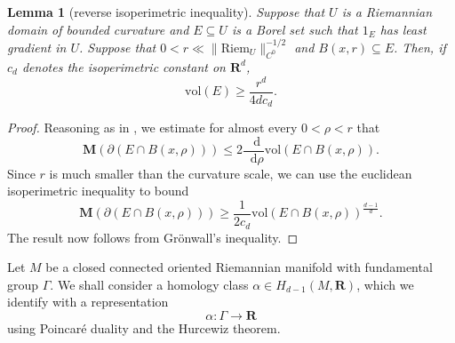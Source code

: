 \documentclass[reqno,11pt]{amsart}
\newcommand{\ZZ}{\mathbf{Z}}
\newcommand{\RR}{\mathbf{R}}
\newcommand{\Sph}{\mathbf S}
\newcommand*\dif{\mathop{}\!\mathrm{d}}
\newcommand{\vol}{\mathrm{vol}}
\DeclareMathOperator{\Gal}{Gal}
\newcommand{\Riem}{\mathrm{Riem}}
\newcommand{\Mass}{\mathbf M}
\newcommand{\dfn}[1]{\emph{#1}\index{#1}}
\newtheorem{lemma}[theorem]{Lemma}
\newtheorem{proposition}[theorem]{Proposition}
\theoremstyle{definition}
\numberwithin{equation}{section}
\begin{document}
\begin{lemma}[reverse isoperimetric inequality]
Suppose that $U$ is a Riemannian domain of bounded curvature and $E \subseteq U$ is a Borel set such that $1_E$ has least gradient in $U$.
Suppose that $0 < r \ll \|\Riem_U\|_{C^0}^{-1/2}$ and $B(x, r) \subseteq E$.
Then, if $c_d$ denotes the isoperimetric constant on $\RR^d$,
\begin{equation}\label{reverse isoperimetric inequality}
\vol(E) \geq \frac{r^d}{4dc_d}.
\end{equation}
\end{lemma}
\begin{proof}
Reasoning as in \cite[Proposition 5.14]{Giusti77}, we estimate for almost every $0 < \rho < r$ that
$$\Mass(\partial(E \cap B(x, \rho))) \leq 2 \frac{\dif}{\dif \rho} \vol(E \cap B(x, \rho)).$$
Since $r$ is much smaller than the curvature scale, we can use the euclidean isoperimetric inequality to bound 
$$\Mass(\partial(E \cap B(x, \rho))) \geq \frac{1}{2c_d} \vol(E \cap B(x, \rho))^{\frac{d - 1}{d}}.$$
The result now follows from Gr\"onwall's inequality.
\end{proof}

Let $M$ be a closed connected oriented Riemannian manifold with fundamental group $\Gamma$.
We shall consider a homology class $\alpha \in H_{d - 1}(M, \RR)$, which we identify with a representation 
$$\alpha: \Gamma \to \RR$$
using Poincar\'e duality and the Hurcewiz theorem. 

\end{document}
